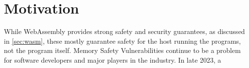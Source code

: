 \chapter{Motivation}
\label{ch:motivation}


While WebAssembly provides strong safety and security guarantees, as discussed in \cref{sec:wasm}, these mostly guarantee safety for the host running the programs, not the program itself.
Memory Safety Vulnerabilities continue to be a problem for software developers and major players in the industry.
In late 2023, a 
